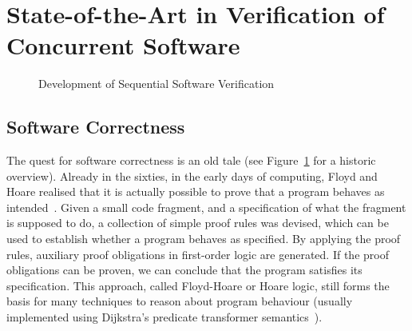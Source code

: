 \section{State-of-the-Art in Verification of Concurrent Software}\label{sec:sota}

\begin{figure}[b]
\caption{Development of Sequential Software Verification}\label{fig:sequential}
\end{figure}

\subsection{Software Correctness}

The quest for software correctness is an old tale (see Figure~\ref{fig:sequential} for a historic overview). Already in the sixties, in the early days of computing, Floyd and Hoare realised that it is actually possible to prove that a program behaves as intended~\cite{Hoare69,Floyd67}. Given a small code fragment, and a specification of what the fragment is supposed to do, a collection of simple proof rules was devised, which can be used to establish whether a program behaves as specified. By applying the proof rules, auxiliary proof obligations in first-order logic are generated. If the proof obligations can be proven, we can conclude that the program satisfies its specification. This approach, called Floyd-Hoare  or Hoare logic, still forms the basis for many techniques to reason about program behaviour (usually implemented using Dijkstra's predicate transformer semantics~\cite{Dijkstra76}).

